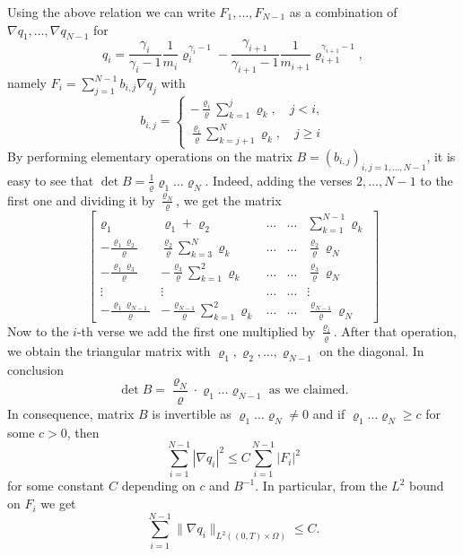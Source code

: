 \documentclass[11pt]{article}
\numberwithin{equation}{section}
\numberwithin{tw}{section}
\begin{document}

Using the above relation we can write $F_1,\dots,F_{N-1}$ as a combination of $\nabla q_1,\dots,\nabla q_{N-1}$ for 
\[ q_i = \frac{\gamma_i}{\gamma_i-1}\frac{1}{m_i}\varrho_i^{\gamma_i-1}-\frac{\gamma_{i+1}}{\gamma_{i+1}-1}\frac{1}{m_{i+1}}\varrho_{i+1}^{\gamma_{i+1}-1}, \]
namely
$\displaystyle F_i = \sum_{j=1}^{N-1} b_{i,j}\nabla q_j $
with
\[ b_{i,j} = \left\{\begin{aligned}
    -\frac{\varrho_i}{\varrho}\sum_{k=1}^j\varrho_k, \quad j<i, \\
    \frac{\varrho_i}{\varrho}\sum_{k=j+1}^N\varrho_k, \quad j\geq i
\end{aligned}\right. \]
By performing elementary operations on the matrix $B=(b_{i,j})_{i,j=1,\dots,N-1}$, it is easy to see that $\det B = \frac{1}{\varrho}\varrho_1\dots\varrho_N$. Indeed, adding the verses $2,\dots,N-1$ to the first one and dividing it by $\frac{\varrho_N}{\varrho}$, we get the matrix
\[\begin{bmatrix}
    \varrho_1 & \varrho_1+\varrho_2 & \dots & \dots & \sum_{k=1}^{N-1}\varrho_k \\
    -\frac{\varrho_1\varrho_2}{\varrho} & \frac{\varrho_2}{\varrho}\sum_{k=3}^N\varrho_k & \dots & \dots & \frac{\varrho_2}{\varrho}\varrho_N \\
    -\frac{\varrho_1\varrho_3}{\varrho} & -\frac{\varrho_3}{\varrho}\sum_{k=1}^2\varrho_k & \dots & \dots & \frac{\varrho_3}{\varrho}\varrho_N \\
    \vdots & \vdots & \dots & \dots & \vdots \\
    -\frac{\varrho_1\varrho_{N-1}}{\varrho} & -\frac{\varrho_{N-1}}{\varrho}\sum_{k=1}^2\varrho_k & \dots & \dots & \frac{\varrho_{N-1}}{\varrho}\varrho_N
\end{bmatrix}\]
Now to the $i$-th verse we add the first one multiplied by $\frac{\varrho_i}{\varrho}$. After that operation, we obtain the triangular matrix with $\varrho_1,\varrho_2,\dots,\varrho_{N-1}$ on the diagonal. In conclusion
\[ \det B = \frac{\varrho_N}{\varrho}\cdot\varrho_1\dots\varrho_{N-1} 
\text{ \ \ as we claimed.} \]
In consequence,  matrix $B$ is invertible as $\varrho_1\dots\varrho_N\neq 0$ and if $\varrho_1\dots\varrho_N\geq c$ for some $c>0$, then 
\[ \sum_{i=1}^{N-1}|\nabla q_i|^2 \leq C\sum_{i=1}^{N-1}|F_i|^2 \]
for some constant $C$ depending on $c$ and $B^{-1}$. In particular, from the $L^2$ bound on $F_i$ we get
\[ \sum_{i=1}^{N-1}\|\nabla q_i\|_{L^2((0,T)\times\Omega)} \leq C. \]
\end{document}
